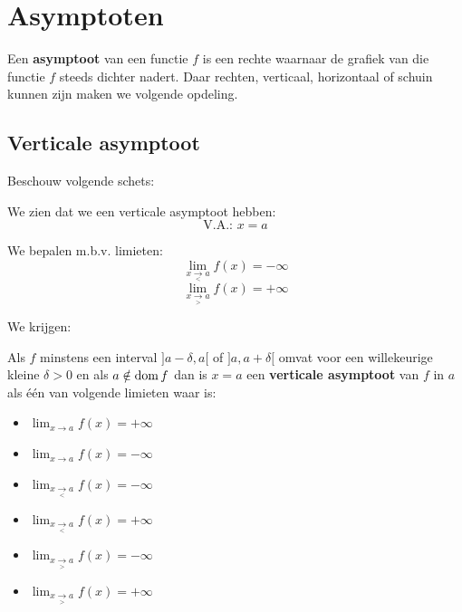 \documentclass[12pt,twoside,a4paper]{article}
\newenvironment{definitie}
{
  \vspace{0.4cm}
  \begin{mdframed}[nobreak=true,frametitle={Definitie}]
  }{%
  \end{mdframed}
}
\begin{document}
\cleardoublepage
\section{Asymptoten}

Een {\bf asymptoot} van een functie $f$ is een rechte waarnaar de grafiek van die functie $f$ steeds dichter nadert. Daar rechten, verticaal, horizontaal of schuin kunnen zijn maken we volgende opdeling.

\subsection{Verticale asymptoot}

\begin{minipage}{0.5\textwidth}
Beschouw volgende schets:
\begin{center}
\end{center}
\end{minipage}
\begin{minipage}{0.5\textwidth}
We zien dat we een verticale asymptoot hebben:
$$\mbox{V.A.: }x=a$$

We bepalen m.b.v. limieten:
$$\lim_{x\underset{<}{\to}a} f(x)=-\infty$$
$$\lim_{x\underset{>}{\to}a} f(x)=+\infty$$
\vfill
\end{minipage}

We krijgen:

\begin{definitie}
Als $f$ minstens een interval $]a-\delta,a[$ of $]a,a+\delta[$ omvat voor een willekeurige kleine $\delta>0$ en als $a\notin \dom f$ dan is $x=a$ een {\bf verticale asymptoot} van $f$ in $a$ als één van volgende limieten waar is:
\begin{multicols}{3}
  \begin{itemize}
    \item $\lim_{x\to a} f(x)=+\infty$
    \item $\lim_{x\to a} f(x)=-\infty$
    \item $\lim_{x\underset{<}{\to}a} f(x)=-\infty$
    \item $\lim_{x\underset{<}{\to}a} f(x)=+\infty$
    \item $\lim_{x\underset{>}{\to}a} f(x)=-\infty$
    \item $\lim_{x\underset{>}{\to}a} f(x)=+\infty$
  \end{itemize}
\end{multicols}
\end{definitie}
\end{document}
